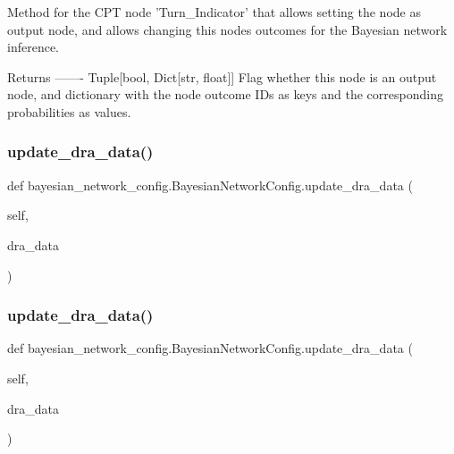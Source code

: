 \begin{DoxyVerb}Method for the CPT node 'Turn_Indicator' that allows setting the node as output node, 
and allows changing this nodes outcomes for the Bayesian network inference.

Returns
-------
Tuple[bool, Dict[str, float]]
    Flag whether this node is an output node, and dictionary with the node outcome IDs as keys 
    and the corresponding probabilities as values.
\end{DoxyVerb}
 \mbox{\label{classbayesian__network__config_1_1_bayesian_network_config_a5324414961900ca2eede9cc160a24ff7}} 
\subsubsection{\texorpdfstring{update\+\_\+dra\+\_\+data()}{update\_dra\_data()}\hspace{0.1cm}{\footnotesize\ttfamily [1/3]}}
{\footnotesize\ttfamily def bayesian\+\_\+network\+\_\+config.\+Bayesian\+Network\+Config.\+update\+\_\+dra\+\_\+data (\begin{DoxyParamCaption}\item[{}]{self,  }\item[{}]{dra\+\_\+data }\end{DoxyParamCaption})}

\mbox{\label{classbayesian__network__config_1_1_bayesian_network_config_a5324414961900ca2eede9cc160a24ff7}} 
\subsubsection{\texorpdfstring{update\+\_\+dra\+\_\+data()}{update\_dra\_data()}\hspace{0.1cm}{\footnotesize\ttfamily [2/3]}}
{\footnotesize\ttfamily def bayesian\+\_\+network\+\_\+config.\+Bayesian\+Network\+Config.\+update\+\_\+dra\+\_\+data (\begin{DoxyParamCaption}\item[{}]{self,  }\item[{}]{dra\+\_\+data }\end{DoxyParamCaption})}


